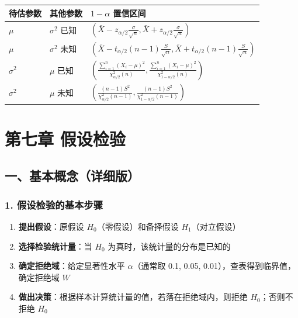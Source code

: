 \documentclass[12pt,a4paper]{ctexart}
\begin{document}
\begin{center}
    \begin{tabular}{@{}lll@{}}
        \toprule
        \textbf{待估参数} & \textbf{其他参数} & \textbf{$1-\alpha$ 置信区间}                                                                                                          \\ \midrule
        $\mu$         & $\sigma^2$ 已知 & $\left(\bar{X} - z_{\alpha/2} \frac{\sigma}{\sqrt{n}}, \bar{X} + z_{\alpha/2} \frac{\sigma}{\sqrt{n}}\right)$                     \\
        $\mu$         & $\sigma^2$ 未知 & $\left(\bar{X} - t_{\alpha/2}(n-1) \frac{S}{\sqrt{n}}, \bar{X} + t_{\alpha/2}(n-1) \frac{S}{\sqrt{n}}\right)$                     \\
        $\sigma^2$    & $\mu$ 已知      & $\left(\frac{\sum_{i=1}^n (X_i - \mu)^2}{\chi^2_{\alpha/2}(n)}, \frac{\sum_{i=1}^n (X_i - \mu)^2}{\chi^2_{1-\alpha/2}(n)}\right)$ \\
        $\sigma^2$    & $\mu$ 未知      & $\left(\frac{(n-1)S^2}{\chi^2_{\alpha/2}(n-1)}, \frac{(n-1)S^2}{\chi^2_{1-\alpha/2}(n-1)}\right)$                                 \\ \bottomrule
    \end{tabular}
\end{center}

\newpage
\section{第七章 假设检验}

\subsection{一、基本概念（详细版）}

\subsubsection{1. 假设检验的基本步骤}
\begin{enumerate}[noitemsep]
    \item \textbf{提出假设}：原假设 $H_0$（零假设）和备择假设 $H_1$（对立假设）
    \item \textbf{选择检验统计量}：当 $H_0$ 为真时，该统计量的分布是已知的
    \item \textbf{确定拒绝域}：给定显著性水平 $\alpha$（通常取 0.1, 0.05, 0.01），查表得到临界值，确定拒绝域 $W$
    \item \textbf{做出决策}：根据样本计算统计量的值，若落在拒绝域内，则拒绝 $H_0$；否则不拒绝 $H_0$
\end{enumerate}
\end{document}
